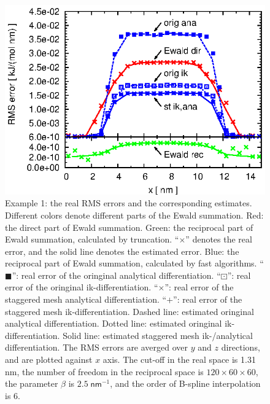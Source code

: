 \documentclass[aps,pre,preprint]{revtex4}
\renewcommand{\v}[1]{\textbf{\textit{#1}}}
\begin{document}
\begin{figure}
  \centering
  \includegraphics[]{fig.new/fig.rand1.error.eps}
  \caption{
    Example 1: the real RMS errors and the corresponding
    estimates. Different colors denote
    different parts of the Ewald summation. Red: the direct
    part of Ewald summation. Green: the reciprocal
    part of Ewald summation, calculated by truncation.
    ``$\times$'' denotes the real error, and the solid line denotes
    the estimated error.
    Blue: the reciprocal part of Ewald summation, calculated
    by fast algorithms. ``$\blacksquare$'': real error of
    the oringinal analytical
    differentiation. ``$\boxdot$'': real error of the oringinal ik-differentiation.
    ``$\times$'': real error of the staggered mesh analytical differentiation.
    ``$+$'': real error of the staggered mesh ik-differentiation.
    Dashed line: estimated oringinal analytical differentiation.
    Dotted line: estimated oringinal ik-differentiation.
    Solid line: estimated staggered mesh ik-/analytical differentiation.
    The RMS errors are averged over $y$ and $z$ directions, and are
    plotted against $x$ axis.
    The cut-off in the real space is 1.31 \textsf{nm}, the number of
    freedom in the reciprocal space is $120\times 60\times 60$, the
    parameter $\beta$ is $2.5\; \textsf{nm}^{-1}$, and the order of
    B-spline interpolation is 6.
    }

\end{figure}
\end{document}
